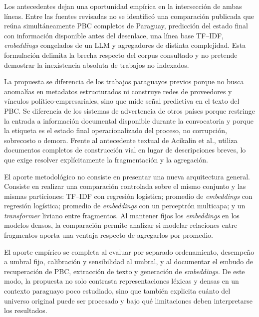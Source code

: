Los antecedentes dejan una oportunidad empírica en la intersección de ambas líneas. Entre las fuentes revisadas no se identificó una comparación publicada que reúna simultáneamente PBC completos de Paraguay, predicción del estado final con información disponible antes del desenlace, una línea base TF--IDF, \textit{embeddings} congelados de un LLM y agregadores de distinta complejidad. Esta formulación delimita la brecha respecto del corpus consultado y no pretende demostrar la inexistencia absoluta de trabajos no indexados.

La propuesta se diferencia de los trabajos paraguayos previos porque no busca anomalías en metadatos estructurados ni construye redes de proveedores y vínculos político-empresariales, sino que mide señal predictiva en el texto del PBC. Se diferencia de los sistemas de advertencia de otros países porque restringe la entrada a información documental disponible durante la convocatoria y porque la etiqueta es el estado final operacionalizado del proceso, no corrupción, sobrecosto o demora. Frente al antecedente textual de Acikalin et al., utiliza documentos completos de construcción vial en lugar de descripciones breves, lo que exige resolver explícitamente la fragmentación y la agregación.

El aporte metodológico no consiste en presentar una nueva arquitectura general. Consiste en realizar una comparación controlada sobre el mismo conjunto y las mismas particiones: TF--IDF con regresión logística; promedio de \textit{embeddings} con regresión logística; promedio de \textit{embeddings} con un perceptrón multicapa; y un \textit{transformer} liviano entre fragmentos. Al mantener fijos los \textit{embeddings} en los modelos densos, la comparación permite analizar si modelar relaciones entre fragmentos aporta una ventaja respecto de agregarlos por promedio.

El aporte empírico se completa al evaluar por separado ordenamiento, desempeño a umbral fijo, calibración y sensibilidad al umbral, y al documentar el embudo de recuperación de PBC, extracción de texto y generación de \textit{embeddings}. De este modo, la propuesta no solo contrasta representaciones léxicas y densas en un contexto paraguayo poco estudiado, sino que también explicita cuánto del universo original puede ser procesado y bajo qué limitaciones deben interpretarse los resultados.
